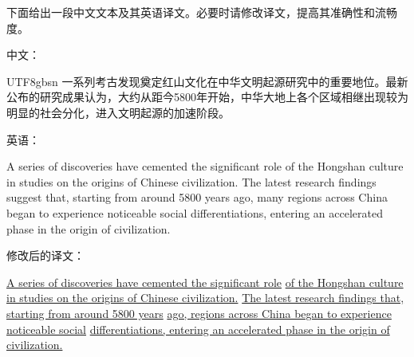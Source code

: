 \vspace{0.5em}
\begin{tcolorbox}

\begingroup
\setlength{\leftskip}{2em}
\setlength{\rightskip}{2em}

下面给出一段中文文本及其英语译文。必要时请修改译文，提高其准确性和流畅度。\vfill

\vspace{0.5em}

中文：

\vspace{0.2em}

\begin{CJK*}{UTF8}{gbsn}
一系列考古发现奠定红山文化在中华文明起源研究中的重要地位。最新公布的研究成果认为，大约从距今5800年开始，中华大地上各个区域相继出现较为明显的社会分化，进入文明起源的加速阶段。
\end{CJK*}

\vspace{0.5em}

英语：

\vspace{0.2em}

A series of discoveries have cemented the significant role of the Hongshan culture in studies on the origins of Chinese civilization. The latest research findings suggest that, starting from around 5800 years ago, many regions across China began to experience noticeable social differentiations, entering an accelerated phase in the origin of civilization.

\vspace{0.5em}

修改后的译文：

\vspace{0.2em}

\underline{A series of  discoveries have cemented the significant role} \underline{of the Hongshan culture in studies on the origins of Chinese civilization.} \underline{The latest research findings  that, starting from around 5800 years} \underline{ago,  regions across China began to experience noticeable social} \underline{differentiations, entering an accelerated phase in the origin of civilization.}

\endgroup

\end{tcolorbox}
\vspace{0.5em}

